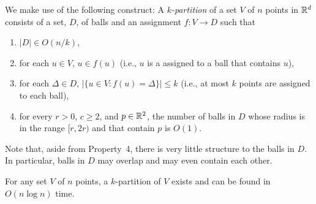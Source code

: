 \documentclass{patmorin}
\begin{document}
We make use of the following construct:  A \emph{$k$-partition} of a
set $V$ of $n$ points in $\mathbb{R}^d$ consists of a set, $D$, of balls and an
assignment $f:V\to D$ such that
\begin{enumerate}
  \item $|D|\in O(n/k)$,
  \item for each $u\in V$, $u\in f(u)$ (i.e., $u$ is a assigned to a
    ball that contains $u$),
  \item for each $\Delta\in D$, $|\{u\in V: f(u)=\Delta\}|\le k$ (i.e.,
   at most $k$ points are assigned to each ball),
  \item for every $r> 0$, $c\ge 2$, and $p\in\mathbb{R}^2$, the number of balls
   in $D$ whose radius is in the range $[r,2r)$ and that contain $p$
   is $O(1)$.
\end{enumerate}

Note that, aside from Property~4, there is very little structure to
the balls in $D$. In particular, balls in $D$ may overlap and may even
contain each other.

\begin{lem}
  For any set $V$ of $n$ points, a $k$-partition of $V$ exists and can
  be found in $O(n\log n)$ time.
\end{lem}
\end{document}
